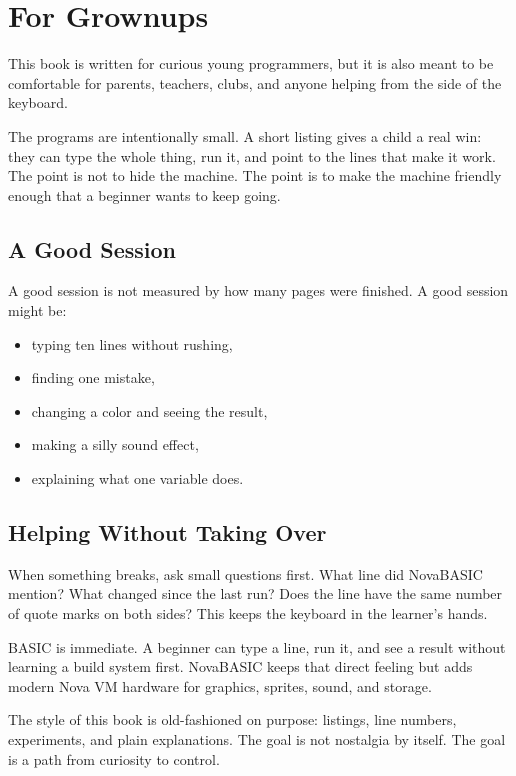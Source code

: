 \chapter*{For Grownups}
{}

This book is written for curious young programmers, but it is also meant to be
comfortable for parents, teachers, clubs, and anyone helping from the side of
the keyboard.

The programs are intentionally small. A short listing gives a child a real win:
they can type the whole thing, run it, and point to the lines that make it work.
The point is not to hide the machine. The point is to make the machine friendly
enough that a beginner wants to keep going.

\section*{A Good Session}
{}

A good session is not measured by how many pages were finished. A good session
might be:

\begin{itemize}
\item typing ten lines without rushing,
\item finding one mistake,
\item changing a color and seeing the result,
\item making a silly sound effect,
\item explaining what one variable does.
\end{itemize}

\section*{Helping Without Taking Over}
{}

When something breaks, ask small questions first. What line did NovaBASIC
mention? What changed since the last run? Does the line have the same number of
quote marks on both sides? This keeps the keyboard in the learner's hands.

\begin{novabox}[title=Why BASIC?]
BASIC is immediate. A beginner can type a line, run it, and see a result
without learning a build system first. NovaBASIC keeps that direct feeling but
adds modern Nova VM hardware for graphics, sprites, sound, and storage.
\end{novabox}

The style of this book is old-fashioned on purpose: listings, line numbers,
experiments, and plain explanations. The goal is not nostalgia by itself. The
goal is a path from curiosity to control.
